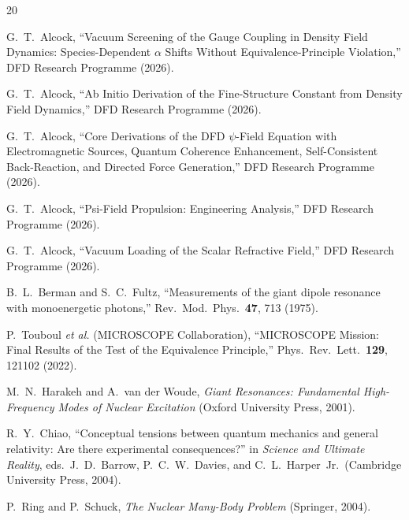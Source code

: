 \documentclass[aps,prd,twocolumn,superscriptaddress,nofootinbib]{revtex4-2}
\begin{document}
\begin{thebibliography}{20}

G.~T.~Alcock,
``Vacuum Screening of the Gauge Coupling in Density Field Dynamics:
Species-Dependent $\alpha$ Shifts Without Equivalence-Principle Violation,''
DFD Research Programme (2026).

G.~T.~Alcock,
``Ab Initio Derivation of the Fine-Structure Constant from Density
Field Dynamics,''
DFD Research Programme (2026).

G.~T.~Alcock,
``Core Derivations of the DFD $\psi$-Field Equation with Electromagnetic
Sources, Quantum Coherence Enhancement, Self-Consistent Back-Reaction,
and Directed Force Generation,''
DFD Research Programme (2026).

G.~T.~Alcock,
``Psi-Field Propulsion: Engineering Analysis,''
DFD Research Programme (2026).

G.~T.~Alcock,
``Vacuum Loading of the Scalar Refractive Field,''
DFD Research Programme (2026).

B.~L.~Berman and S.~C.~Fultz,
``Measurements of the giant dipole resonance with monoenergetic
photons,''
Rev.\ Mod.\ Phys.\ \textbf{47}, 713 (1975).

P.~Touboul \textit{et al.} (MICROSCOPE Collaboration),
``MICROSCOPE Mission: Final Results of the Test of the
Equivalence Principle,''
Phys.\ Rev.\ Lett.\ \textbf{129}, 121102 (2022).

M.~N.~Harakeh and A.~van der Woude,
\textit{Giant Resonances: Fundamental High-Frequency Modes of
Nuclear Excitation} (Oxford University Press, 2001).

R.~Y.~Chiao,
``Conceptual tensions between quantum mechanics and general
relativity: Are there experimental consequences?''
in \textit{Science and Ultimate Reality}, eds.\ J.~D.~Barrow,
P.~C.~W.~Davies, and C.~L.~Harper~Jr.\ (Cambridge University Press, 2004).

P.~Ring and P.~Schuck,
\textit{The Nuclear Many-Body Problem} (Springer, 2004).

\end{thebibliography}
\end{document}
